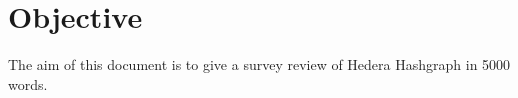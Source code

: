 \section{Objective}
The aim of this document is to give a survey review of Hedera Hashgraph in 5000 words.
